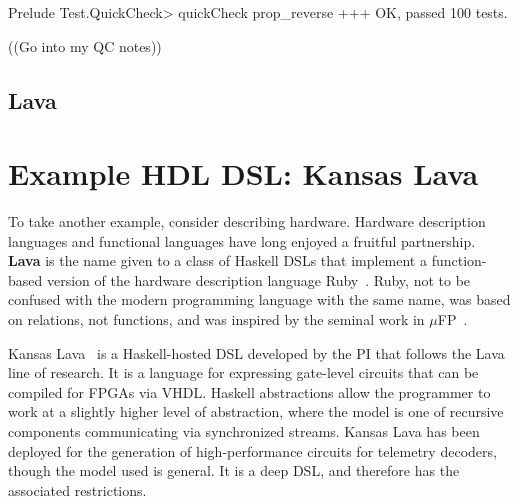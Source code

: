 \documentclass[11pt]{article}
\begin{document}
\begin{Code}
Prelude Test.QuickCheck> quickCheck prop_reverse 
+++ OK, passed 100 tests.
\end{Code}

((Go into my QC notes))

\subsection{Lava}

\section{Example HDL DSL: Kansas Lava}
\label{sec:KansasLava}

To take another example, consider describing hardware.
Hardware description languages and functional languages have
long enjoyed a fruitful partnership.
{\bf Lava} is the name given to a class of Haskell DSLs
that implement a function-based version of the hardware description
language Ruby~\cite{Jones:90:Ruby,Hutton:93:RubyInterp}. Ruby, not to be confused with the
modern programming language with the same name, was based
on relations, not functions, and was inspired by
the seminal work in $\mu$FP~\cite{Sheeran:84:muFP}.

Kansas Lava~\cite{Gill:13:TypesKansasLava} is a Haskell-hosted DSL developed by the PI
that follows the Lava line of research.
It is a language for expressing gate-level circuits that can be compiled for FPGAs via VHDL.
Haskell abstractions allow the programmer to work at
a slightly higher level of abstraction, where the model
is one of recursive components communicating via synchronized streams.
Kansas Lava has been deployed for the generation of high-performance circuits for telemetry decoders,
though the model used is general.
It is a deep DSL, and therefore
has the associated restrictions.
\end{document}
